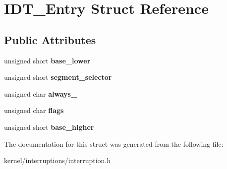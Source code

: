 \hypertarget{structIDT__Entry}{}\section{I\+D\+T\+\_\+\+Entry Struct Reference}
\label{structIDT__Entry}
\subsection*{Public Attributes}
\begin{DoxyCompactItemize}
\item 
unsigned short {\bfseries base\+\_\+lower}\hypertarget{structIDT__Entry_af5fb4951c2835d6fef5bee0fede4d5df}{}\label{structIDT__Entry_af5fb4951c2835d6fef5bee0fede4d5df}

\item 
unsigned short {\bfseries segment\+\_\+selector}\hypertarget{structIDT__Entry_ae6f3288003c46f9e5b057585d58d0b01}{}\label{structIDT__Entry_ae6f3288003c46f9e5b057585d58d0b01}

\item 
unsigned char {\bfseries always\+\_}\hypertarget{structIDT__Entry_af04270e2e53cb5a82f72f1526d9dd9ad}{}\label{structIDT__Entry_af04270e2e53cb5a82f72f1526d9dd9ad}

\item 
unsigned char {\bfseries flags}\hypertarget{structIDT__Entry_a833fb6868a097dd2872692e4c190c285}{}\label{structIDT__Entry_a833fb6868a097dd2872692e4c190c285}

\item 
unsigned short {\bfseries base\+\_\+higher}\hypertarget{structIDT__Entry_a4bfa3ecc95f4b2487fa66e9940332ad2}{}\label{structIDT__Entry_a4bfa3ecc95f4b2487fa66e9940332ad2}

\end{DoxyCompactItemize}


The documentation for this struct was generated from the following file\+:\begin{DoxyCompactItemize}
\item 
kernel/interruptions/interruption.\+h\end{DoxyCompactItemize}
